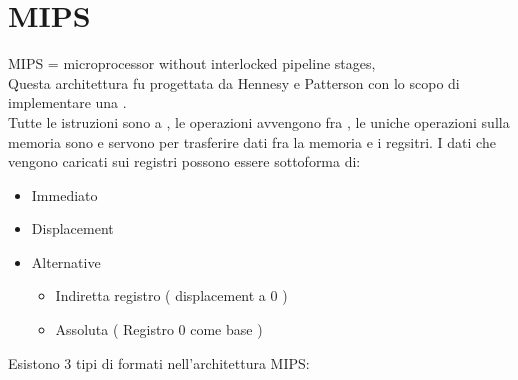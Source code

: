 \documentclass[arch.tex]{subfiles}
\begin{document}
\section{MIPS}%
\label{sec:mips}
MIPS = microprocessor without interlocked pipeline stages,\\
Questa architettura fu progettata da Hennesy e Patterson con lo scopo di 
implementare una .\\
Tutte le istruzioni sono a , le operazioni avvengono fra
, le uniche operazioni sulla memoria sono  e 
servono per trasferire dati fra la memoria e i regsitri. I dati che vengono caricati
sui registri possono essere sottoforma di: 

%
\label{ppar:Modi di indirizzamento}

\begin{itemize}
	\item Immediato	
	\item Displacement
	\item Alternative
		\begin{itemize}
			\item Indiretta registro ( displacement a 0 )
			\item Assoluta ( Registro 0 come base ) 
		\end{itemize}
\end{itemize}

%
\label{ppar:Formato Istruzioni}
Esistono 3 tipi di formati nell'architettura MIPS:
\end{document}
